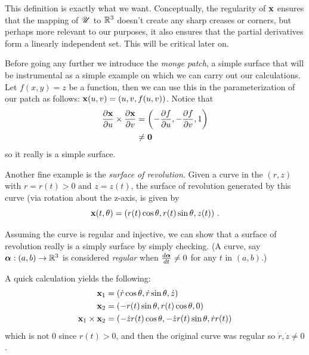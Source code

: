 This definition is exactly what we want. Conceptually, the regularity of $\mathbf{x}$ ensures that the mapping of $\mathscr{U}$ to $\mathbb{R}^3$ doesn't create any sharp creases or corners, but perhaps more relevant to our purposes, it also ensures that the partial derivatives form a linearly independent set. This will be critical later on.

\begin{ex} %
  Before going any further we introduce the \emph{monge patch}, a simple surface that will be instrumental as a simple example on which we can carry out our calculations. Let $f(x, y) = z$ be a function, then we can use this in the parameterization of our patch as follows: $\mathbf{x}(u, v) = (u, v, f(u, v))$. Notice that
  \begin{align*}
    \frac{\partial\mathbf{x}}{\partial u} \times \frac{\partial\mathbf{x}}{\partial v} &= \left(-\frac{\partial f}{\partial u}, -\frac{\partial f}{\partial v}, 1\right)\\
    &\neq \mathbf{0}
  \end{align*}
  so it really is a simple surface.
\end{ex}

\begin{ex} %
  \label{ex:revolution}
  Another fine example is the \emph{surface of revolution}. Given a curve in the $(r, z)$ with $r = r(t) > 0$ and $z = z(t)$, the surface of revolution generated by this curve (via rotation about the z-axis, is given by
  \[
    \mathbf{x}(t, \theta) = (r(t)\cos\theta, r(t)\sin\theta, z(t)) \ .
  \]

  Assuming the curve is regular and injective, we can show that a surface of revolution really is a simply surface by simply checking. (A curve, say $\boldsymbol{\alpha} : (a, b) \to \mathbb{R}^3$ is considered \emph{regular} when $\frac{d\boldsymbol{\alpha}}{dt} \neq 0$ for any $t$ in $(a, b)$.)

  A quick calculation yields the following:
  \begin{align*}
    \mathbf{x}_1 &= (\dot{r}\cos{\theta}, \dot{r}\sin{\theta}, \dot{z})\\
    \mathbf{x}_2 &= (-r(t)\sin{\theta}, r(t)\cos{\theta}, 0)\\
    \mathbf{x}_1 \times \mathbf{x}_2 &= (-\dot{z} r(t) \cos{\theta}, -\dot{z} r(t) \sin{\theta}, \dot{r}r(t))
  \end{align*}
  which is not $0$ since $r(t) > 0$, and then the original curve was regular so $\dot{r}, \dot{z} \neq 0$.
\end{ex}


